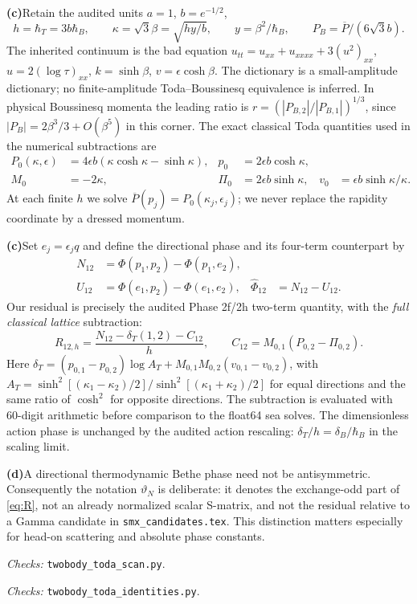 \documentclass[11pt,a4paper]{article}
\newcommand{\C}{\textbf{(c)}\nobreakspace}
\newcommand{\D}{\textbf{(d)}\nobreakspace}
\newcommand{\file}[1]{\nolinkurl{#1}}
\newcommand{\checks}[1]{\par\noindent\textit{Checks:} \file{twobody_toda_#1.py}.\par}
\begin{document}
\C Retain the audited units $a=1$, $b=e^{-1/2}$,
\begin{equation}
 h=\hbar_T=3b\hbar_B,\qquad
 \kappa=\sqrt3\beta=\sqrt{hy/b},\qquad y=\beta^2/\hbar_B,
 \qquad P_B=\overline P/(6\sqrt3b).
 \label{eq:units}
\end{equation}
The inherited continuum is the bad equation
$u_{tt}=u_{xx}+u_{xxxx}+3(u^2)_{xx}$, $u=2(\log\tau)_{xx}$,
$k=\sinh\beta$, $v=\epsilon\cosh\beta$.
The dictionary is a small-amplitude dictionary; no finite-amplitude
Toda--Boussinesq equivalence is inferred.
In physical Boussinesq momenta the leading ratio is
$r=(|P_{B,2}|/|P_{B,1}|)^{1/3}$, since
$|P_B|=2\beta^3/3+O(\beta^5)$ in this corner.
The exact classical Toda quantities used in the numerical subtractions are
\begin{align}
 P_0(\kappa,\epsilon)&=4\epsilon b(\kappa\cosh\kappa-\sinh\kappa),
 &p_0&=2\epsilon b\cosh\kappa,\\
 M_0&=-2\kappa,&\Pi_0&=2\epsilon b\sinh\kappa,
 &v_0&=\epsilon b\sinh\kappa/\kappa.
\end{align}
At each finite $h$ we solve $\overline P(p_j)=P_0(\kappa_j,\epsilon_j)$;
we never replace the rapidity coordinate by a dressed momentum.

\C Set $e_j=\epsilon_jq$ and define the directional phase and its
four-term counterpart by
\begin{align}
 N_{12}&=\Phi(p_1,p_2)-\Phi(p_1,e_2),\\
 U_{12}&=\Phi(e_1,p_2)-\Phi(e_1,e_2),&
 \widehat\Phi_{12}&=N_{12}-U_{12}.
 \label{eq:references}
\end{align}
Our residual is precisely the audited Phase 2f/2h two-term quantity,
with the \emph{full classical lattice} subtraction:
\begin{equation}
 R_{12,h}=\frac{N_{12}-\delta_T(1,2)-C_{12}}h,
 \qquad C_{12}=M_{0,1}(P_{0,2}-\Pi_{0,2}).
 \label{eq:R}
\end{equation}
Here $\delta_T=(p_{0,1}-p_{0,2})\log A_T+M_{0,1}M_{0,2}(v_{0,1}-v_{0,2})$,
with $A_T=\sinh^2[(\kappa_1-\kappa_2)/2]/\sinh^2[(\kappa_1+\kappa_2)/2]$
for equal directions and the same ratio of $\cosh^2$ for opposite directions.
The subtraction is evaluated with 60-digit arithmetic before comparison to
the float64 sea solves. The dimensionless action phase is unchanged by the
audited action rescaling: $\delta_T/h=\delta_B/\hbar_B$ in the scaling limit.

\D A directional thermodynamic Bethe phase need not be antisymmetric.
Consequently the notation $\vartheta_N$ is deliberate: it denotes the
exchange-odd part of \eqref{eq:R}, not an already normalized scalar
S-matrix, and not the residual relative to a Gamma candidate in
\file{smx_candidates.tex}. This distinction matters especially for head-on
scattering and absolute phase constants.
\checks{scan}\checks{identities}
\end{document}
